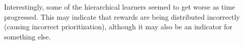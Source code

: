 \documentclass{article}
\begin{document}
	Interestingly, some of the hierarchical learners seemed to get worse as time progressed. This may indicate that rewards are being distributed incorrectly (causing incorrect prioritization), although it may also be an indicator for something else.


\newpage


\newpage
\begin{appendices}


\end{appendices}
\end{document}
